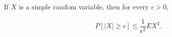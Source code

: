 If $X$ is a simple random variable, then for every $\epsilon > 0$,

$$P[|X| \geq \epsilon] \leq \frac{1}{\epsilon^2} EX^2.$$
